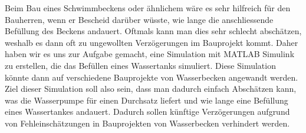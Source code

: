 Beim Bau eines Schwimmbeckens oder ähnlichem wäre es sehr hilfreich für den 	Bauherren, wenn er Bescheid darüber wüsste, wie lange die anschliessende 		Befüllung des Beckens andauert. Oftmals kann man dies sehr schlecht 			abschätzen, weshalb es dann oft zu ungewollten Verzögerungen im 				Bauprojekt kommt. Daher haben wir es uns zur Aufgabe gemacht, eine 				Simulation mit MATLAB Simulink zu erstellen, die das Befüllen eines 			Wassertanks simuliert. Diese Simulation könnte dann auf verschiedene 			Bauprojekte von Wasserbecken angewandt werden.\\

Ziel dieser Simulation soll also sein, dass man dadurch einfach Abschätzen 		kann, was die Wasserpumpe für einen Durchsatz liefert und wie lange eine 		Befüllung eines Wassertankes andauert. Dadurch sollen künftige 					Verzögerungen aufgrund von Fehleinschätzungen in Bauprojekten von 				Wasserbecken verhindert werden.

